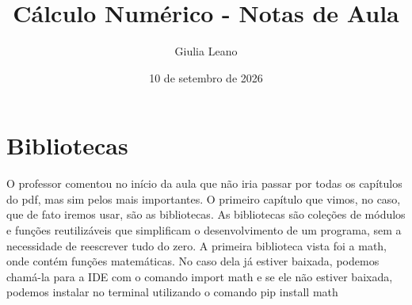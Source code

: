 \documentclass{article}
\title{Cálculo Numérico - Notas de Aula}
\author{Giulia Leano}
\date{10 de setembro de 2026}
\begin{document}
\maketitle

\section{Bibliotecas}
O professor comentou no início da aula que não iria passar por todas os capítulos do pdf, mas sim pelos mais importantes.
O primeiro capítulo que vimos, no caso, que de fato iremos usar, são as bibliotecas. As bibliotecas são 
coleções de módulos e funções reutilizáveis que simplificam o desenvolvimento de um programa, sem a necessidade de reescrever tudo do zero. A primeira biblioteca vista foi a math, onde contém funções matemáticas. 
No caso dela já estiver baixada, podemos chamá-la para a IDE com o comando import math e se ele não estiver baixada, podemos instalar no terminal utilizando o comando pip install math
\end{document}
